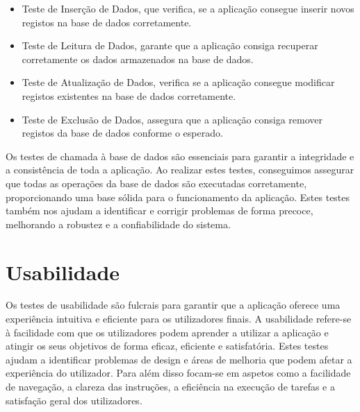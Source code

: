 \documentclass[a4paper,12pt]{report}
\begin{document}
	\begin{itemize}
		\item Teste de Inserção de Dados, que verifica, se a aplicação consegue inserir novos registos na base de dados corretamente.
		
		\item Teste de Leitura de Dados, garante que a aplicação consiga recuperar corretamente os dados armazenados na base de dados.
		
		\item Teste de Atualização de Dados, verifica se a aplicação consegue modificar registos existentes na base de dados corretamente.
		
		\item Teste de Exclusão de Dados, assegura que a aplicação consiga remover registos da base de dados conforme o esperado.
	\end{itemize}
	
	Os testes de chamada à base de dados são essenciais para garantir a integridade e a consistência de toda a aplicação. Ao realizar estes testes, conseguimos assegurar que todas as operações da base de dados são executadas corretamente, proporcionando uma base sólida para o funcionamento da aplicação. Estes testes também nos ajudam a identificar e corrigir problemas de forma precoce, melhorando a robustez e a confiabilidade do sistema.
	
	\section{Usabilidade}
	
	Os testes de usabilidade são fulcrais para garantir que a aplicação oferece uma experiência intuitiva e eficiente para os utilizadores finais. A usabilidade refere-se à facilidade com que os utilizadores podem aprender a utilizar a aplicação e atingir os seus objetivos de forma eficaz, eficiente e satisfatória. Estes testes ajudam a identificar problemas de design e áreas de melhoria que podem afetar a experiência do utilizador. Para além disso focam-se em aspetos como a facilidade de navegação, a clareza das instruções, a eficiência na execução de tarefas e a satisfação geral dos utilizadores.
	
\end{document}
